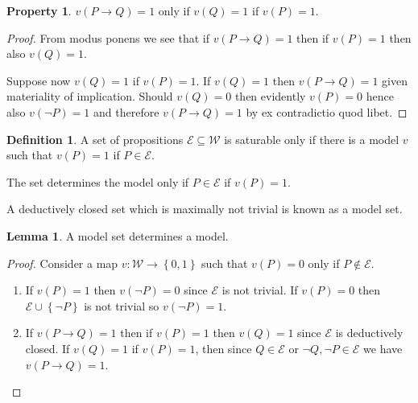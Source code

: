 \documentclass{amsbook}
\newcommand{\setsm}[1]{\left\{#1\right\}}
\newcommand{\wffs}{\mathcal W}
\newcommand{\then}{\mathrel\rightarrow}
\theoremstyle{definition}
\newtheorem{prop}{Property}[section]
\newtheorem{lmm}{Lemma}[section]
\newtheorem{dfn}{Definition}[section]
\begin{document}
\begin{prop}
    $v(P \then Q) = 1$ only if $v(Q) = 1$ if $v(P) = 1$.
    \begin{proof}
        From modus ponens we see that if $v(P \then Q) = 1$ then if $v(P) = 1$ then also $v(Q) = 1$.

        Suppose now $v(Q) = 1$ if $v(P) = 1$. If $v(Q) = 1$ then $v(P \then Q) = 1$ given materiality of implication. Should $v(Q) = 0$ then evidently $v(P) = 0$ hence also $v(\neg P) = 1$ and therefore $v(P \then Q) = 1$ by ex contradictio quod libet.
    \end{proof}
\end{prop}

\begin{dfn}
    A set of propositions $\mathcal E \subseteq \wffs$ is saturable only if there is a model $v$ such that $v(P) = 1$ if $P \in \mathcal E$.

    The set determines the model only if $P \in \mathcal E$ if $v(P) = 1$.

    A deductively closed set which is maximally not trivial is known as a model set.
\end{dfn}

\begin{lmm}
    A model set determines a model.
    \begin{proof}
        Consider a map $v: \wffs \longrightarrow \setsm{0,1}$ such that $v(P) = 0$ only if $P \notin \mathcal E$.
        \begin{enumerate}
            \item If $v(P) = 1$ then $v(\neg P) = 0$ since $\mathcal E$ is not trivial. If $v(P) = 0$ then $\mathcal E \cup \setsm {\neg P}$ is not trivial so $v(\neg P) = 1$.
            \item If $v(P \then Q) = 1$ then if $v(P) = 1$ then $v(Q) = 1$ since $\mathcal E$ is deductively closed. If $v(Q) = 1$ if $v(P) = 1$, then since $Q \in \mathcal E$ or $\neg Q, \neg P \in \mathcal E$ we have $v(P \then Q) = 1$.
        \end{enumerate}
    \end{proof}
\end{lmm}
\end{document}
